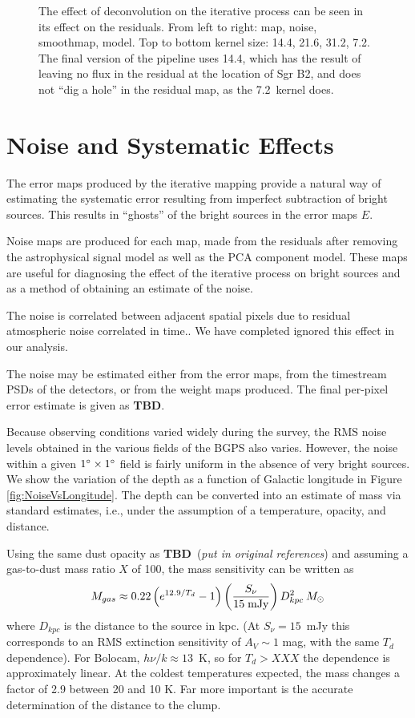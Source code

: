 \documentclass[12pt,preprint]{aastex}
\def\msol{\ifmmode {\>M_\odot}\else {$M_\odot$}\fi}
\newcommand{\TBD}{{\bf TBD}}
\def\Figure#1#2#3#4{
\begin{figure}[htb]
\epsscale{#4}
\plotone{#1}
\caption{#2}
\label{#3}
\end{figure}
}
\begin{document}
\Figure{l001_deconvolutionkernelcompare}{The effect of deconvolution
on the iterative process can be seen in its effect on the
residuals. From left to right: map, noise, smoothmap, model. Top to
bottom kernel size: 14.4\arcsec, 21.6\arcsec, 31.2\arcsec,
7.2\arcsec. The final version of the pipeline uses 14.4\arcsec, which
has the result of leaving no flux in the residual at the location of
Sgr B2, and does not ``dig a hole'' in the residual map, as the
7.2\arcsec\ kernel does.}{fig:Deconvolution}{1.0}

\clearpage

\section{Noise and Systematic Effects}
\label{sec:Noise}

The error maps produced by the iterative mapping provide a natural way
of estimating the systematic error resulting from imperfect
subtraction of bright sources.  This results in ``ghosts'' of the
bright sources in the error maps $E$.  

Noise maps are produced for each map, made from the residuals after
removing the astrophysical signal model as well as the PCA component
model.  These maps are useful for diagnosing the effect of the
iterative process on bright sources and as a method of obtaining an
estimate of the noise.

The noise is correlated between adjacent spatial pixels due to
residual atmospheric noise correlated in time..  We have completed
ignored this effect in our analysis.

The noise may be estimated either from the error maps, from the
timestream PSDs of the detectors, or from the weight maps
produced. The final per-pixel error estimate is given as \TBD.

Because observing conditions varied widely during the survey, the RMS
noise levels obtained in the various fields of the BGPS also varies.
However, the noise within a given $1\mbox{$^\circ$} \times 1\mbox{$^\circ$}$ field is
fairly uniform in the absence of very bright sources.  We show the
variation of the depth as a function of Galactic longitude in Figure
\ref{fig:NoiseVsLongitude}.  The depth can be converted into an
estimate of mass via standard estimates, i.e., under the assumption of
a temperature, opacity, and distance.

Using the same dust opacity as \TBD\ ({\it put in original references})
and assuming a gas-to-dust mass ratio $X$ of 100, the mass sensitivity
can be written as
\begin{equation} 
\label{eq:Mass}
M_{gas}\approx
0.22\left( e^{12.9/T_d}-1 \right) \left({S_\nu\over 15\; {\rm mJy}} \right)
D^{2}_{kpc} \msol 
\end{equation}
where $D_{kpc}$ is the distance to the source in kpc.  (At $S_\nu =
15$~mJy this corresponds to an RMS extinction sensitivity of $A_V\sim
1$ mag, with the same $T_d$ dependence).  For Bolocam, $h\nu/k \approx
13$~K, so for $T_d > XXX$ the dependence is approximately linear.  At
the coldest temperatures expected, the mass changes a factor of 2.9
between 20 and 10 K.  Far more important is the accurate determination
of the distance to the clump.
\end{document}

